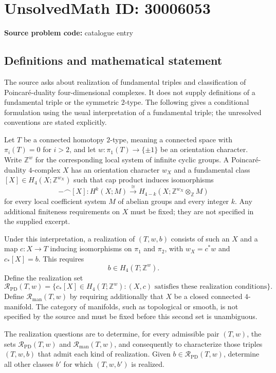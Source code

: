\documentclass[11pt]{article}
\begin{document}
\section*{UnsolvedMath ID: 30006053}
\textbf{Source problem code:} catalogue entry
\subsection{Definitions and mathematical statement}
The source asks about realization of fundamental triples and classification of Poincar\'e-duality four-dimensional complexes. It does not supply definitions of a fundamental triple or the symmetric $2$-type. The following gives a conditional formulation using the usual interpretation of a fundamental triple; the unresolved conventions are stated explicitly.

Let $T$ be a connected homotopy $2$-type, meaning a connected space with $\pi_i(T)=0$ for $i>2$, and let $w\colon\pi_1(T)\to\{\pm1\}$ be an orientation character. Write $\mathbb Z^w$ for the corresponding local system of infinite cyclic groups. A Poincar\'e-duality $4$-complex $X$ has an orientation character $w_X$ and a fundamental class $[X]\in H_4(X;\mathbb Z^{w_X})$ such that cap product induces isomorphisms
\[
-\frown[X]\colon H^k(X;M)\xrightarrow{\cong}H_{4-k}(X;\mathbb Z^{w_X}\otimes_{\mathbb Z}M)
\]
for every local coefficient system $M$ of abelian groups and every integer $k$. Any additional finiteness requirements on $X$ must be fixed; they are not specified in the supplied excerpt.

Under this interpretation, a realization of $(T,w,b)$ consists of such an $X$ and a map $c\colon X\to T$ inducing isomorphisms on $\pi_1$ and $\pi_2$, with $w_X=c^*w$ and $c_*[X]=b$. This requires
\[
b\in H_4(T;\mathbb Z^w).
\]
Define the realization set
\[
\mathcal R_{\mathrm{PD}}(T,w)=\bigl\{c_*[X]\in H_4(T;\mathbb Z^w): (X,c)\text{ satisfies these realization conditions}\bigr\}.
\]
Define $\mathcal R_{\mathrm{man}}(T,w)$ by requiring additionally that $X$ be a closed connected $4$-manifold. The category of manifolds, such as topological or smooth, is not specified by the source and must be fixed before this second set is unambiguous.

The realization questions are to determine, for every admissible pair $(T,w)$, the sets $\mathcal R_{\mathrm{PD}}(T,w)$ and $\mathcal R_{\mathrm{man}}(T,w)$, and consequently to characterize those triples $(T,w,b)$ that admit each kind of realization. Given $b\in\mathcal R_{\mathrm{PD}}(T,w)$, determine all other classes $b'$ for which $(T,w,b')$ is realized.
\end{document}
